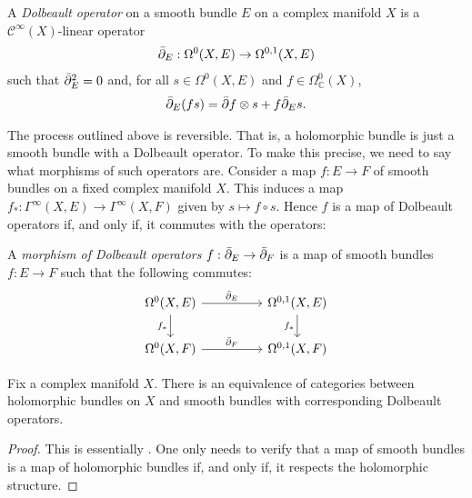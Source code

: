 \documentclass[12pt]{ociamthesis}  %
\begin{document}
\begin{definition}
  A \emph{Dolbeault operator} on a smooth bundle $E$ on a complex
  manifold $X$ is a $\mathscr C^\infty(X)$-linear operator
  \begin{align*}
    {\bar{\partial}}_E : \Omega^0(X,E) \to \Omega^{0,1}(X,E)
  \end{align*}
  such that ${\bar{\partial}}_E^2 = 0$ and, for all $s\in\Omega^0(X,E)$ and
  $f\in \Omega^0_{\mathbb C}(X)$,
  \begin{align*}
    {\bar{\partial}}_E (fs) = {\bar{\partial}} f\otimes s + f {\bar{\partial}}_E s.
  \end{align*}
\end{definition}

The process outlined above is reversible. That is, a holomorphic
bundle is just a smooth bundle with a Dolbeault operator. To make
this precise, we need to say what morphisms of such operators are.
Consider a map $f : E \to F$ of smooth bundles on a fixed complex
manifold $X$. This induces a map
$f_*:\Gamma^\infty(X,E)\to\Gamma^\infty(X,F)$
given by $s \mapsto f\circ s$. Hence $f$ is a map of Dolbeault operators
if, and only if, it commutes with the operators:

\begin{definition}
  A \emph{morphism of Dolbeault operators} $f : {\bar{\partial}}_E \to {\bar{\partial}}_F$
  is a map of smooth bundles $f : E\to F$ such that the following commutes:
  \begin{equation*}
    \begin{tikzcd}
      {\Omega^0(X,E)} && {\Omega^{0,1}(X,E)} \\
      {\Omega^0(X,F)} && {\Omega^{0,1}(X,F)}
      \arrow["{\bar\partial_E}", from=1-1, to=1-3]
      \arrow["{f_*}"', from=1-1, to=2-1]
      \arrow["{f_*}"', from=1-3, to=2-3]
      \arrow["{\bar\partial_F}", from=2-1, to=2-3]
    \end{tikzcd}
  \end{equation*}
\end{definition}

\begin{theorem}
  Fix a complex manifold $X$. There is an equivalence of categories
  between holomorphic bundles on $X$ and smooth bundles with corresponding
  Dolbeault operators.
  \begin{proof}
    This is essentially \cite[Theorem 3.2]{moroianu2004}. One only
    needs to verify that a map of smooth bundles is a map of
    holomorphic bundles if, and only if, it respects the holomorphic
    structure. 
  \end{proof}
\end{theorem}
\end{document}
